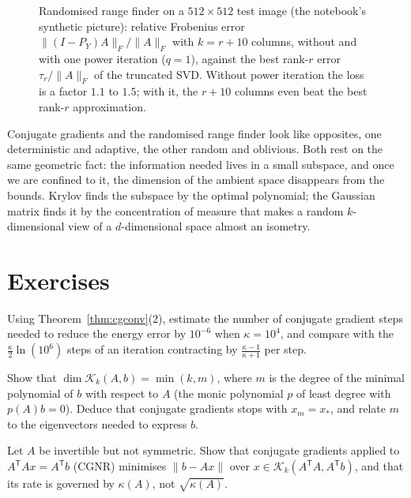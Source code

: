 \begin{figure}[ht]
\centering
{}
\caption{Randomised range finder on a $512\times512$ test image (the notebook's synthetic picture): relative Frobenius error $\|(I-P_Y)A\|_F/\|A\|_F$ with $k=r+10$ columns, without and with one
power iteration ($q=1$), against the best rank-$r$ error $\tau_r/\|A\|_F$ of the truncated SVD. Without power iteration the loss is a factor $1.1$ to $1.5$; with it,
the $r+10$ columns even beat the best rank-$r$ approximation.}
\label{fig:rsvd}
\end{figure}

\begin{beauty}
Conjugate gradients and the randomised range finder look like opposites, one deterministic and adaptive, the other random and oblivious. Both rest on the same
geometric fact: the information needed lives in a small subspace, and once we are confined to it, the dimension of the ambient space disappears from the
bounds. Krylov finds the subspace by the optimal polynomial; the Gaussian matrix finds it by the concentration of measure that makes a random $k$-dimensional
view of a $d$-dimensional space almost an isometry.
\end{beauty}

\section{Exercises}

\begin{exercise}[$\star$]\label{ex:cgcount}
Using Theorem~\ref{thm:cgconv}(2), estimate the number of conjugate gradient steps needed to reduce the energy error by $10^{-6}$ when $\kappa=10^4$, and compare with the
$\frac{\kappa}2\ln(10^6)$ steps of an iteration contracting by $\frac{\kappa-1}{\kappa+1}$ per step.
\end{exercise}

\begin{exercise}[$\star$]\label{ex:krylovdim}
Show that $\dim\mathcal K_k(A,b)=\min(k,m)$, where $m$ is the degree of the minimal polynomial of $b$ with respect to $A$ (the monic polynomial $p$ of least degree with
$p(A)b=0$). Deduce that conjugate gradients stops with $x_m=x_*$, and relate $m$ to the eigenvectors needed to express $b$.
\end{exercise}

\begin{exercise}[$\star\star$]\label{ex:cgnormal}
Let $A$ be invertible but not symmetric. Show that conjugate gradients applied to $A^{\mathsf T}Ax=A^{\mathsf T}b$ (CGNR) minimises $\|b-Ax\|$ over $x\in\mathcal K_k(A^{\mathsf T}A,A^{\mathsf T}b)$,
and that its rate is governed by $\kappa(A)$, not $\sqrt{\kappa(A)}$.
\end{exercise}

